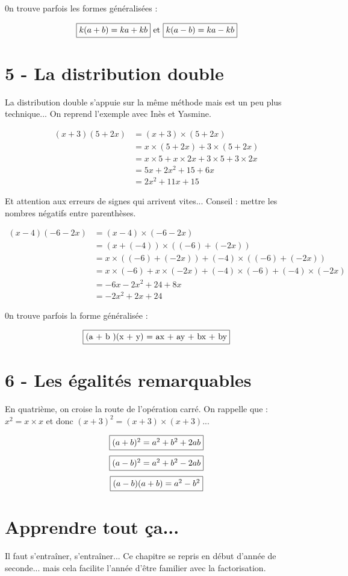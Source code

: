 \documentclass[11pt]{article}
\begin{document}
0n trouve parfois les formes généralisées : 

$$\fbox{$k(a + b ) = ka + kb$} \text{ et } \fbox{$k(a - b ) = ka - kb$}$$

\section*{5 - La distribution double}

La distribution double s'appuie sur la même méthode mais est un peu plus technique... 
On reprend l'exemple avec Inès et Yasmine. 

\begin{align*}
  (x + 3)(5 + 2x) &= (x + 3) \times (5 + 2x) \\
                  &= x \times (5 + 2x) + 3 \times (5 + 2x) \\
                  &= x \times 5 + x \times 2x + 3 \times 5 + 3 \times 2x \\
                  &= 5x + 2x^2 + 15 + 6x \\
                  &= 2x^2 + 11x + 15     
\end{align*}

Et attention aux erreurs de signes qui arrivent vites... Conseil : mettre les nombres négatifs entre parenthèses.

\begin{align*}
  (x - 4)(-6 - 2x) &= (x - 4) \times (-6 - 2x) \\
                   &= (x + (-4)) \times ((-6) + (-2x)) \\
                  &= x \times ((-6) + (-2x)) + (-4) \times ((-6) + (-2x)) \\
                  &= x \times (-6) + x \times (-2x) + (-4)  \times (-6) + (-4) \times (-2x) \\
                  &= -6x - 2x^2 + 24 + 8x \\
                  &= -2x^2 + 2x + 24     
\end{align*}

0n trouve parfois la forme généralisée : 

$$\fbox{(a + b )(x + y) = ax + ay + bx + by}$$

\section*{6 - Les égalités remarquables}

En quatrième, on croise la route de l'opération carré. On rappelle que : $x^2 = x \times x$ et donc $(x+3)^2 = (x+3) \times (x+3)$... 

$$\fbox{$(a + b)^2 = a^2 + b^2 + 2ab$}$$
$$\fbox{$(a - b)^2 = a^2 + b^2 - 2ab$}$$
$$\fbox{$(a - b)(a+b)= a^2 - b^2$}$$

\section*{Apprendre tout ça...}

Il faut s'entraîner, s'entraîner... Ce chapitre se repris en début d'année de seconde... mais cela facilite l'année d'être familier avec la factorisation.
\end{document}
